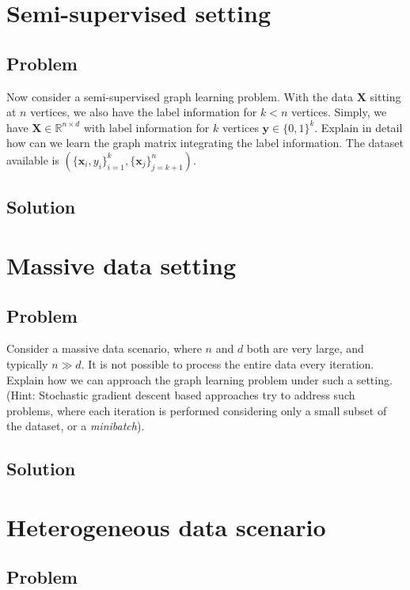 \documentclass[a4paper]{article}
\newcommand{\mf}{\mathbf}
\newcommand{\R}{\mathbb{R}}
\begin{document}
\section{Semi-supervised setting}

\subsection{Problem}

Now consider a semi-supervised graph learning problem. With the data $\mf{X}$ sitting at $n$ vertices, we also have the label information for $k < n$ vertices. Simply, we have $\mf{X} \in \R^{n \times
d}$ with label information for $k$ vertices $\mf{y} \in \{0, 1\}^k$. Explain in detail how can we learn the graph matrix integrating the label information. The dataset available is
$\left(\{\mf{x}_i, y_i\}_{i = 1}^k, \{\mf{x}_j\}_{j = k + 1}^n\right)$.

\subsection{Solution}


\section{Massive data setting}

\subsection{Problem}

Consider a massive data scenario, where $n$ and $d$ both are very large, and typically $n \gg d$. It is not possible to process the entire data every iteration. Explain how we can approach
the graph learning problem under such a setting. (Hint: Stochastic gradient descent based approaches try to address such problems, where each iteration is performed considering only a small
subset of the dataset, or a \emph{minibatch}).

\subsection{Solution}


\section{Heterogeneous data scenario}

\subsection{Problem}
\end{document}
